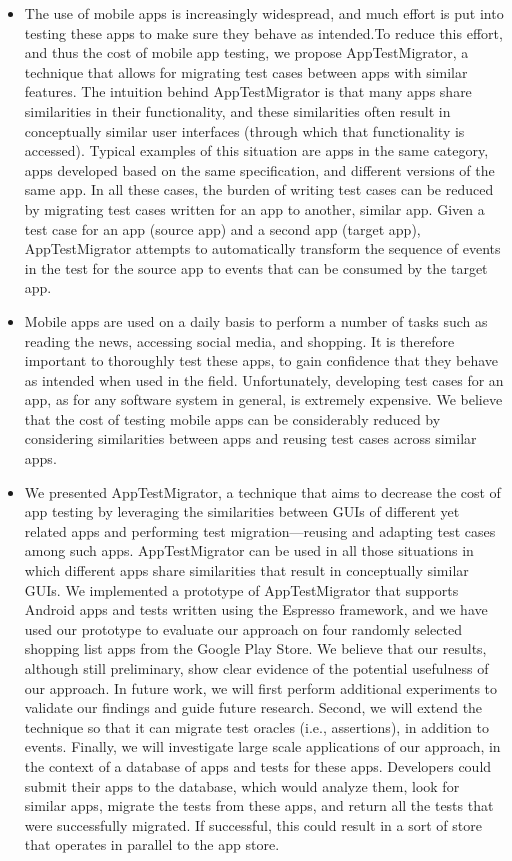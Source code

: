     \begin{itemize}
        
        \item
        The use of mobile apps is increasingly widespread, and much effort is put into testing these apps to make sure they behave as intended.To reduce this effort, and thus the cost of mobile app testing, we propose AppTestMigrator, a technique that allows for migrating test cases between apps with similar features. The intuition behind AppTestMigrator is that many apps share similarities in their functionality, and these similarities often result in conceptually similar user interfaces (through which that functionality is accessed). Typical examples of this situation are apps in the same category, apps developed based on the same specification, and different versions of the same app. In all these cases, the burden of writing test cases can be reduced by migrating test cases written for an app to another, similar app. Given a test case for an app (source app) and a second app (target app), AppTestMigrator attempts to automatically transform the sequence of events in the test for the source app to events that can be consumed by the target app.\cite{Test_Migration}
        \item
        Mobile apps are used on a daily basis to perform a number of tasks such as reading the news, accessing social media, and shopping. It is therefore important to thoroughly test these apps, to gain confidence that they behave as intended when used in the field. Unfortunately, developing test cases for an app, as for any software system in general, is extremely expensive. We believe that the cost of testing mobile apps can be considerably reduced by considering similarities between apps and reusing test cases across similar apps. \cite{Test_Migration}
        \item
        We presented AppTestMigrator, a technique that aims to decrease the cost of app testing by leveraging the similarities between GUIs of different yet related apps and performing test migration—reusing and adapting test cases among such apps. AppTestMigrator can be used in all those situations in which different apps share similarities that result in conceptually similar GUIs. We implemented a prototype of AppTestMigrator that supports Android apps and tests written using the Espresso framework, and we have used our prototype to evaluate our approach on four randomly selected shopping list apps from the Google Play Store. We believe that our results, although still preliminary, show clear evidence of the potential usefulness of our approach. In future work, we will first perform additional experiments to validate our findings and guide future research. Second, we will extend the technique so that it can migrate test oracles (i.e., assertions), in addition to events. Finally, we will investigate large scale applications of our approach, in the context of a database of apps and tests for these apps. Developers could submit their apps to the database, which would analyze them, look for similar apps, migrate the tests from these apps, and return all the tests that were successfully migrated. If successful, this could result in a sort of store that operates in parallel to the app store. \cite{Test_Migration}

\end{itemize}
